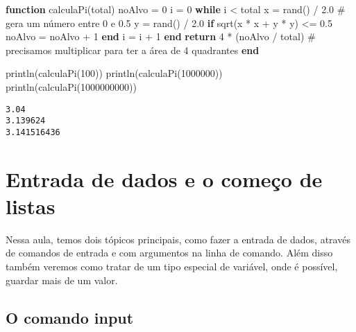 \documentclass[
  letterpaper,
  DIV=11,
  numbers=noendperiod]{scrreprt}
\newenvironment{Shaded}{\begin{snugshade}}{\end{snugshade}}
\newcommand{\CommentTok}[1]{\textcolor[rgb]{0.37,0.37,0.37}{#1}}
\newcommand{\ControlFlowTok}[1]{\textcolor[rgb]{0.00,0.23,0.31}{\textbf{#1}}}
\newcommand{\FloatTok}[1]{\textcolor[rgb]{0.68,0.00,0.00}{#1}}
\newcommand{\FunctionTok}[1]{\textcolor[rgb]{0.28,0.35,0.67}{#1}}
\newcommand{\KeywordTok}[1]{\textcolor[rgb]{0.00,0.23,0.31}{\textbf{#1}}}
\newcommand{\NormalTok}[1]{\textcolor[rgb]{0.00,0.23,0.31}{#1}}
\newcommand{\OperatorTok}[1]{\textcolor[rgb]{0.37,0.37,0.37}{#1}}
\begin{document}
\begin{Shaded}
\begin{Highlighting}[]
\KeywordTok{function} \FunctionTok{calculaPi}\NormalTok{(total)}
\NormalTok{   noAlvo }\OperatorTok{=} \FloatTok{0}
\NormalTok{   i }\OperatorTok{=} \FloatTok{0}
   \ControlFlowTok{while}\NormalTok{ i }\OperatorTok{\textless{}}\NormalTok{ total}
\NormalTok{     x }\OperatorTok{=} \FunctionTok{rand}\NormalTok{() }\OperatorTok{/} \FloatTok{2.0} \CommentTok{\# gera um número entre 0 e 0.5}
\NormalTok{     y }\OperatorTok{=} \FunctionTok{rand}\NormalTok{() }\OperatorTok{/} \FloatTok{2.0}
     \ControlFlowTok{if} \FunctionTok{sqrt}\NormalTok{(x }\OperatorTok{*}\NormalTok{ x }\OperatorTok{+}\NormalTok{ y }\OperatorTok{*}\NormalTok{ y) }\OperatorTok{\textless{}=} \FloatTok{0.5}
\NormalTok{       noAlvo }\OperatorTok{=}\NormalTok{ noAlvo }\OperatorTok{+} \FloatTok{1}
     \ControlFlowTok{end}
\NormalTok{     i }\OperatorTok{=}\NormalTok{ i }\OperatorTok{+} \FloatTok{1}
   \ControlFlowTok{end}
   \ControlFlowTok{return} \FloatTok{4} \OperatorTok{*}\NormalTok{ (noAlvo }\OperatorTok{/}\NormalTok{ total)  }\CommentTok{\# precisamos multiplicar para ter a área de 4 quadrantes}
\KeywordTok{end} 

\FunctionTok{println}\NormalTok{(}\FunctionTok{calculaPi}\NormalTok{(}\FloatTok{100}\NormalTok{))}
\FunctionTok{println}\NormalTok{(}\FunctionTok{calculaPi}\NormalTok{(}\FloatTok{1000000}\NormalTok{))}
\FunctionTok{println}\NormalTok{(}\FunctionTok{calculaPi}\NormalTok{(}\FloatTok{1000000000}\NormalTok{))}
\end{Highlighting}
\end{Shaded}

\begin{verbatim}
3.04
3.139624
3.141516436
\end{verbatim}


\chapter{Entrada de dados e o começo de
listas}\label{entrada-de-dados-e-o-comeuxe7o-de-listas}

Nessa aula, temos dois tópicos principais, como fazer a entrada de
dados, através de comandos de entrada e com argumentos na linha de
comando. Além disso também veremos como tratar de um tipo especial de
variável, onde é possível, guardar mais de um valor.

\section{O comando input}\label{o-comando-input}
\end{document}
